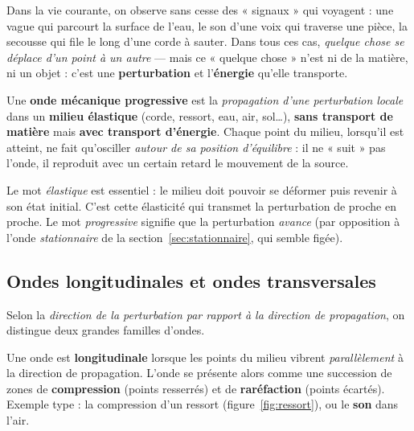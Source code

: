 \documentclass[11pt,a4paper]{article}
\begin{document}
Dans la vie courante, on observe sans cesse des « signaux » qui voyagent : une vague
qui parcourt la surface de l'eau, le son d'une voix qui traverse une pièce, la secousse
qui file le long d'une corde à sauter. Dans tous ces cas, \emph{quelque chose se déplace
d'un point à un autre} — mais ce « quelque chose » n'est ni de la matière, ni un objet :
c'est une \textbf{perturbation} et l'\textbf{énergie} qu'elle transporte.

\begin{definition}
Une \textbf{onde mécanique progressive} est la \emph{propagation d'une perturbation locale}
dans un \textbf{milieu élastique} (corde, ressort, eau, air, sol\ldots), \textbf{sans transport
de matière} mais \textbf{avec transport d'énergie}. Chaque point du milieu, lorsqu'il est
atteint, ne fait qu'osciller \emph{autour de sa position d'équilibre} : il ne « suit » pas l'onde,
il reproduit avec un certain retard le mouvement de la source.
\end{definition}

\begin{remarque}
Le mot \emph{élastique} est essentiel : le milieu doit pouvoir se déformer puis revenir à son
état initial. C'est cette élasticité qui transmet la perturbation de proche en proche. Le mot
\emph{progressive} signifie que la perturbation \emph{avance} (par opposition à l'onde
\emph{stationnaire} de la section~\ref{sec:stationnaire}, qui semble figée).
\end{remarque}

\subsection{Ondes longitudinales et ondes transversales}

Selon la \emph{direction de la perturbation par rapport à la direction de propagation}, on
distingue deux grandes familles d'ondes.

\begin{definition}
Une onde est \textbf{longitudinale} lorsque les points du milieu vibrent
\emph{parallèlement} à la direction de propagation. L'onde se présente alors comme une
succession de zones de \textbf{compression} (points resserrés) et de \textbf{raréfaction}
(points écartés). Exemple type : la compression d'un ressort (figure~\ref{fig:ressort}), ou
le \textbf{son} dans l'air.
\end{definition}
\end{document}
